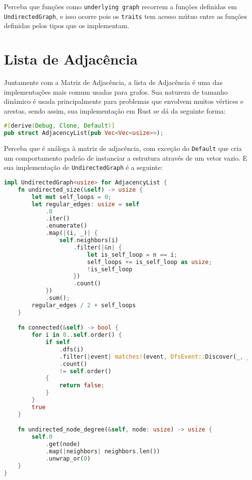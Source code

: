 Perceba que funções como \texttt{underlying graph} recorrem a funções definidas em \texttt{UndirectedGraph}, e isso ocorre pois os \texttt{traits} tem acesso mútuo entre as funções definidas pelos tipos que os implementam.

\section{Lista de Adjacência}

Juntamente com a Matriz de Adjacência, a lista de Adjacência é uma das implementações mais comum usadas para grafos. Sua natureza de tamanho dinâmico é usada principalmente para problemas que envolvem muitos vértices e arestas, sendo assim, sua implementação em Rust se dá da seguinte forma:

\begin{lstlisting}[language=Rust, caption={Implementação de Graph na Estrutura de Dados Matriz de Adjacência}, label=list:impl_adj_mat_g]
#[derive(Debug, Clone, Default)]
pub struct AdjacencyList(pub Vec<Vec<usize>>);
\end{lstlisting}

Perceba que é análoga à matriz de adjacência, com exceção do \texttt{Default} que cria um comportamento padrão de instanciar a estrutura através de um vetor vazio. E sua implementação de \texttt{UndirectedGraph} é a seguinte:

\begin{lstlisting}[language=Rust, caption={Implementação de Graph na Estrutura de Dados Matriz de Adjacência}, label=list:impl_adj_list_ug]
impl UndirectedGraph<usize> for AdjacencyList {
    fn undirected_size(&self) -> usize {
        let mut self_loops = 0;
        let regular_edges: usize = self
            .0
            .iter()
            .enumerate()
            .map(|(i, _)| {
                self.neighbors(i)
                    .filter(|&n| {
                        let is_self_loop = n == i;
                        self_loops += is_self_loop as usize;
                        !is_self_loop
                    })
                    .count()
            })
            .sum();
        regular_edges / 2 + self_loops
    }

    fn connected(&self) -> bool {
        for i in 0..self.order() {
            if self
                .dfs(i)
                .filter(|event| matches!(event, DfsEvent::Discover(_, _)))
                .count()
                != self.order()
            {
                return false;
            }
        }
        true
    }

    fn undirected_node_degree(&self, node: usize) -> usize {
        self.0
            .get(node)
            .map(|neighbors| neighbors.len())
            .unwrap_or(0)
    }
}
\end{lstlisting}

